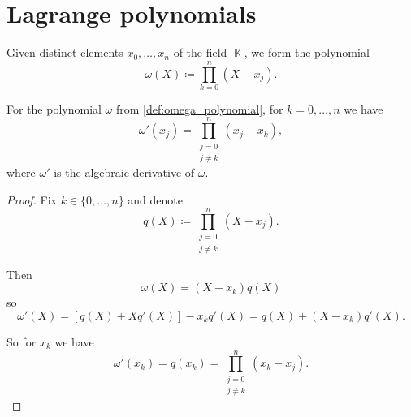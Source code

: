 \section{Lagrange polynomials}\label{sec:lagrange_polynomials}

\begin{definition}\label{def:omega_polynomial}
  Given distinct elements \( x_0, \ldots, x_n \) of the field \( \BbbK \), we form the polynomial
  \begin{equation*}
    \omega(X) \coloneqq \prod_{k=0}^n (X - x_j).
  \end{equation*}
\end{definition}

\begin{proposition}\label{thm:omega_polynomial_derivative}
  For the polynomial \( \omega \) from \cref{def:omega_polynomial}, for \( k = 0, \ldots, n \) we have
  \begin{equation*}
    \omega'(x_j) = \prod_{\substack{j = 0 \\ j \neq k}}^n (x_j - x_k),
  \end{equation*}
  where \( \omega' \) is the \hyperref[def:algebraic_derivative]{algebraic derivative} of \( \omega \).
\end{proposition}
\begin{proof}
  Fix \( k \in \{ 0, \ldots, n \} \) and denote
  \begin{equation*}
    q(X) \coloneqq \prod_{\substack{j = 0 \\ j \neq k}}^n (X - x_j).
  \end{equation*}

  Then
  \begin{equation*}
    \omega(X) = (X - x_k) q(X)
  \end{equation*}
  so
  \begin{equation*}
    \omega'(X) = [q(X) + X q'(X)] - x_k q'(X) = q(X) + (X - x_k) q'(X).
  \end{equation*}

  So for \( x_k \) we have
  \begin{equation*}
    \omega'(x_k) = q(x_k) = \prod_{\substack{j = 0 \\ j \neq k}}^n (x_k - x_j).
  \end{equation*}
\end{proof}

